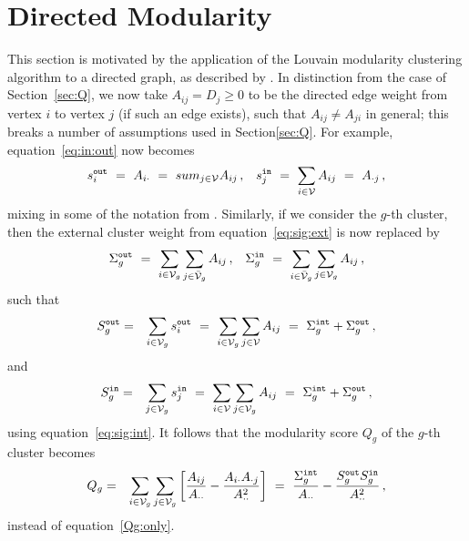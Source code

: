 \documentclass[a4paper]{article}
\begin{document}
\section{Directed Modularity}
This section is motivated by the application of the Louvain modularity clustering algorithm to a directed graph,
as described by \cite{browet14}.
In distinction from the case of Section~\ref{sec:Q}, we now take $A_{ij}=D_{j}\ge 0$ to be the directed edge weight from vertex $i$ to vertex $j$ (if such an
edge exists), such that $A_{ij}\ne A_{ji}$ in general; this breaks a number of assumptions used in Section\ref{sec:Q}.
For example, equation~\eqref{eq:in:out} now becomes
\begin{eqnarray}
  s^{\tt out}_i~=~A_{i\cdot}~=~sum_{j\in{\cal V}} A_{ij}\,,&&
  s^{\tt in}_j~=~\sum_{i\in{\cal V}} A_{ij}~=~A_{\cdot j}\,,
\end{eqnarray}
mixing in some of the notation from \cite{browet14}.
Similarly, if we consider the $g$-th cluster, then the external cluster weight from equation~\eqref{eq:sig:ext} is now replaced by
\begin{eqnarray}
   \Sigma_g^{\tt out}~=~\sum_{i\in{\cal V}_g}\sum_{j\in\bar{\cal V}_g} A_{ij}\,, && 
   \Sigma_g^{\tt in}~=~\sum_{i\in\bar{\cal V}_g}\sum_{j\in{\cal V}_g} A_{ij}\,,
\end{eqnarray}
such that
\begin{eqnarray}
   S^{\tt out}_g & = & \sum_{i\in{\cal V}_g} s^{\tt out}_i~=~\sum_{i\in{\cal V}_g}\sum_{j\in{\cal V}}A_{ij}~=~\Sigma_g^{\tt int}+\Sigma_g^{\tt out}\,,
\end{eqnarray}
and
\begin{eqnarray}
   S^{\tt in}_g & = & \sum_{j\in{\cal V}_g} s^{\tt in}_j~=~\sum_{i\in{\cal V}}\sum_{j\in{\cal V}_g}A_{ij}~=~\Sigma_g^{\tt int}+\Sigma_g^{\tt out}\,,
\end{eqnarray}
using equation~\eqref{eq:sig:int}.
It follows that the modularity score $Q_g$ of the $g$-th cluster becomes
\begin{eqnarray}
   Q_g & = & \sum_{i\in{\cal V}_g}\sum_{j\in{\cal V}_g} \left[
  \frac{A_{ij}}{A_{\cdot\cdot}}-
  \frac{A_{i\cdot}A_{\cdot j}}{A_{\cdot\cdot}^2}
  \right]
~=~    \frac{\Sigma_g^{\tt int}}{A_{\cdot\cdot}}
    -\frac{S_g^{\tt out}S_g^{\tt in}}{A_{\cdot\cdot}^2}\,,
\end{eqnarray}
instead of equation~\eqref{Qg:only}.
\end{document}
